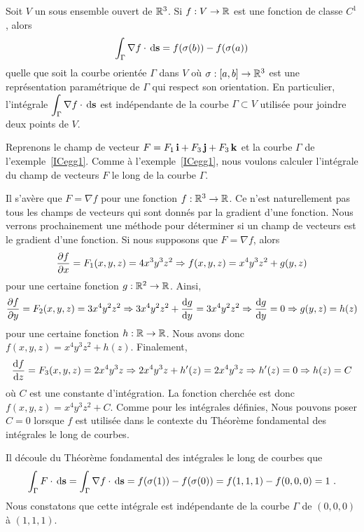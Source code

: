 {\begin{theorem}
Soit $V$ un sous ensemble ouvert de $\mathbb{R}^3$.  Si $f:V \rightarrow \mathbb{R}$ est
une fonction de classe $C^1$, alors
\[
\int_\Gamma \nabla f \cdot \,\mathrm{d}\mathbf{s} = f(\sigma(b)) - f(\sigma(a))
\]
quelle que soit la courbe orientée $\Gamma$ dans $V$ où
$\sigma:[a,b]\to \mathbb{R}^3$ est une représentation paramétrique de
$\Gamma$ qui respect son orientation.  En particulier,
l'intégrale $\displaystyle \int_\Gamma \nabla f \cdot \,\mathrm{d}\mathbf{s}$
est indépendante de la courbe $\Gamma \subset V$ utilisée pour joindre
deux points de $V$.
\end{theorem}

\begin{egg}
Reprenons le champ de vecteur $F = F_1\,\mathbf{i} + F_3\,\mathbf{j}+F_3\,\mathbf{k}$
et la courbe $\Gamma$ de l'exemple~\ref{ICegg1}.  Comme à
l'exemple~\ref{ICegg1}, nous voulons calculer l'intégrale du champ de
vecteurs $F$ le long de la courbe $\Gamma$.

Il s'avère que $F = \nabla f$ pour une fonction $f:\mathbb{R}^3 \to \mathbb{R}$.
Ce n'est naturellement pas tous les champs de vecteurs qui sont donnés
par la gradient d'une fonction.  Nous verrons prochainement une méthode
pour déterminer si un champ de vecteurs est le gradient d'une
fonction.   Si nous supposons que $F = \nabla f$, alors
\[
  \frac{\partial f}{\partial x} = F_1(x,y,z) = 4x^3y^3z^2 \Rightarrow f(x,y,z) = x^4 y^3 z^2 +
  g(y,z)
\]
pour une certaine fonction $g:\mathbb{R}^2 \to \mathbb{R}$.  Ainsi,
\[
  \frac{\partial f}{\partial y} = F_2(x,y,z) = 3x^4y^2z^2 \Rightarrow
  3x^4y^2z^2 + \frac{\mathrm{d}g}{\mathrm{d}y} = 3x^4y^2z^2 \Rightarrow
  \frac{\mathrm{d}g}{\mathrm{d}y} = 0 \Rightarrow g(y,z) = h(z)
\]
pour une certaine fonction $h:\mathbb{R} \to \mathbb{R}$.  Nous avons donc
$f(x,y,z) = x^4 y^3 z^2 + h(z)$.  Finalement,
\[
  \frac{\mathrm{d}f}{\mathrm{d}z} = F_3(x,y,z) = 2x^4y^3z \Rightarrow
  2x^4y^3z + h'(z) = 2x^4y^3z \Rightarrow h'(z) = 0
  \Rightarrow h(z) = C
\]
où $C$ est une constante d'intégration.  La fonction cherchée est donc
$f(x,y,z) = x^4 y^3 z^2 + C$.  Comme pour les intégrales
définies, Nous pouvons poser $C=0$ lorsque $f$ est utilisée dans le
contexte du Théorème fondamental des intégrales le long de courbes.

Il découle du Théorème fondamental des intégrales le long de courbes que
\[
  \int_{\Gamma} F \cdot \,\mathrm{d}\mathbf{s}
  = \int_{\Gamma} \nabla f \cdot \,\mathrm{d}\mathbf{s}
  =f(\sigma(1)) - f(\sigma(0)) = f(1,1,1)-f(0,0,0) = 1 \ .
\]
Nous constatons que cette intégrale est indépendante de la courbe
$\Gamma$ de $(0,0,0)$ à $(1,1,1)$.
\end{egg}

}
